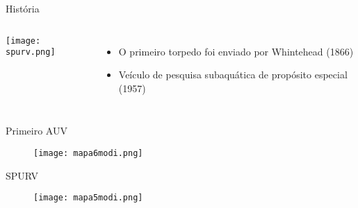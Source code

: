 \begin{frame}[t]{História}

    \begin{columns}
        
               \texttt{[image: spurv.png]}
    
            \begin{itemize}
               \item O primeiro torpedo foi enviado por Whintehead (1866)
               \item Veículo de pesquisa subaquática de propósito especial (1957)
            \end{itemize}
    \end{columns}
\end{frame}

\begin{frame}[c]{Primeiro AUV}
        \begin{figure}
        \texttt{[image: mapa6modi.png]}
    \end{figure}
\end{frame}
\begin{frame}[c]{SPURV}
        \begin{figure}
        \texttt{[image: mapa5modi.png]}
    \end{figure}
\end{frame}
